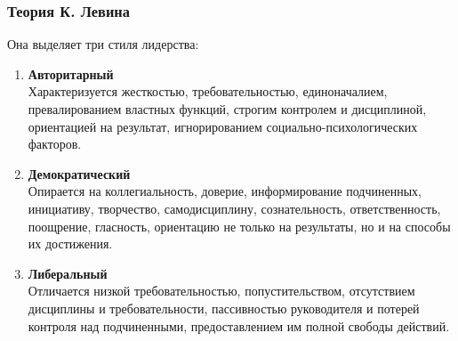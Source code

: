 \documentclass[a4paper,12pt,oneside,final]{extarticle}
\numberwithin{equation}{section}
\begin{document}
\subsubsection{Теория К. Левина}
Она выделяет три стиля лидерства:
\begin{enumerate}
	\item \textbf{Авторитарный} \\
	Характеризуется жесткостью, требовательностью, единоначалием, превалированием властных функций, строгим контролем и дисциплиной, ориентацией на результат, игнорированием социально-психологических факторов.
	\item \textbf{Демократический} \\ 
	Опирается на коллегиальность, доверие, информирование подчиненных, инициативу, творчество, самодисциплину, сознательность, ответственность, поощрение, гласность, ориентацию не только на результаты, но и на способы их достижения.
	\item \textbf{Либеральный} \\ 
	Отличается низкой требовательностью, попустительством, отсутствием дисциплины и требовательности, пассивностью руководителя и потерей контроля над подчиненными, предоставлением им полной свободы действий.
\end{enumerate}
\end{document}

